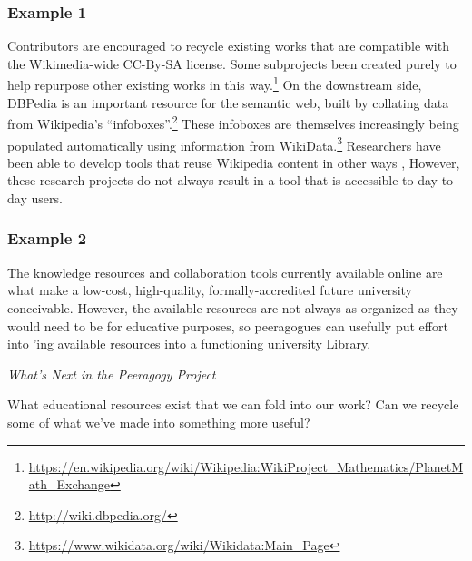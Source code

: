 
\subsubsection*{Example 1}
Contributors are encouraged to recycle existing works that are compatible
with the Wikimedia-wide CC-By-SA license.
Some subprojects been created purely to help repurpose other existing works in this
way.\footnote{\url{https://en.wikipedia.org/wiki/Wikipedia:WikiProject_Mathematics/PlanetMath_Exchange}}
%
On the downstream side, DBPedia is an important resource for the
semantic web, built by collating data from Wikipedia's
``infoboxes''.\footnote{\url{http://wiki.dbpedia.org/}}
%
These infoboxes are themselves increasingly being populated
automatically using information from WikiData.\footnote{\url{https://www.wikidata.org/wiki/Wikidata:Main_Page}}
Researchers have been able to develop tools that reuse Wikipedia content in other ways \cite{reinhold2006wikitrails,riche2010ichase},
However, these research projects do not always result in a tool that
is accessible to day-to-day users.

\vspace{.05cm}

\subsubsection*{Example 2}
The knowledge resources and collaboration tools currently available online
are what make a low-cost, high-quality, formally-accredited future university
conceivable.  However, the available resources are not always as
organized as they would need to be for educative purposes, so peeragogues can usefully put
effort into 'ing available
resources into a functioning university Library.


\begin{framed}
\noindent 
\emph{What's Next in the Peeragogy Project}
\begin{collectinmacro}{\ReduceWN}{}{}
What educational resources exist that we can fold into our work?  Can we recycle some of what we've made into something more useful?  
\end{collectinmacro}
\ReduceWN
\end{framed}

\newpage
